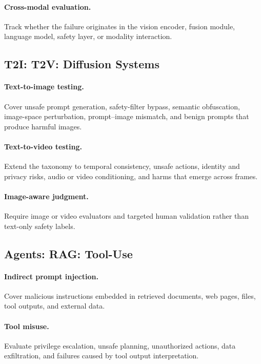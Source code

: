 \documentclass[review]{fcs}
\begin{document}
\paragraph{Cross-modal evaluation.}
Track whether the failure originates in the vision encoder, fusion module, language model, safety layer, or modality interaction.

\subsection{T2I: T2V: Diffusion Systems}

\paragraph{Text-to-image testing.}
Cover unsafe prompt generation, safety-filter bypass, semantic obfuscation, image-space perturbation, prompt--image mismatch, and benign prompts that produce harmful images.

\paragraph{Text-to-video testing.}
Extend the taxonomy to temporal consistency, unsafe actions, identity and privacy risks, audio or video conditioning, and harms that emerge across frames.

\paragraph{Image-aware judgment.}
Require image or video evaluators and targeted human validation rather than text-only safety labels.

\subsection{Agents: RAG: Tool-Use}

\paragraph{Indirect prompt injection.}
Cover malicious instructions embedded in retrieved documents, web pages, files, tool outputs, and external data.

\paragraph{Tool misuse.}
Evaluate privilege escalation, unsafe planning, unauthorized actions, data exfiltration, and failures caused by tool output interpretation.
\end{document}
